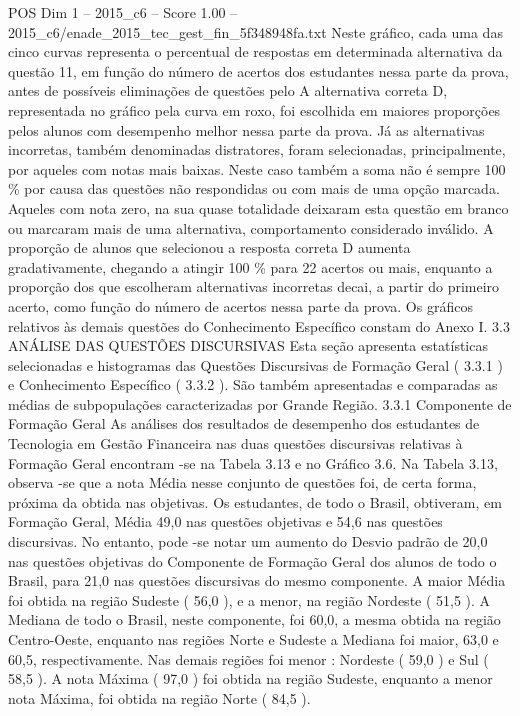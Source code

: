 \begin{textsample}{POS Dim 1 – 2015\_c6 – Score 1.00 – 2015\_c6/enade\_2015\_tec\_gest\_fin\_5f348948fa.txt}
Neste gráfico, cada uma das cinco curvas representa o percentual de respostas em determinada alternativa da questão 11, em função do número de acertos dos estudantes nessa parte da prova, antes de possíveis eliminações de questões pelo A alternativa correta D, representada no gráfico pela curva em roxo, foi escolhida em maiores proporções pelos alunos com desempenho melhor nessa parte da prova.
Já as alternativas incorretas, também denominadas distratores, foram selecionadas, principalmente, por aqueles com notas mais baixas.
Neste caso também a soma não é sempre 100 \% por causa das questões não respondidas ou com mais de uma opção marcada.
Aqueles com nota zero, na sua quase totalidade deixaram esta questão em branco ou marcaram mais de uma alternativa, comportamento considerado inválido.
A proporção de alunos que selecionou a resposta correta D aumenta gradativamente, chegando a atingir 100 \% para 22 acertos ou mais, enquanto a proporção dos que escolheram alternativas incorretas decai, a partir do primeiro acerto, como função do número de acertos nessa parte da prova.
Os gráficos relativos às demais questões do Conhecimento Específico constam do Anexo I. 3.3 ANÁLISE DAS QUESTÕES DISCURSIVAS Esta seção apresenta estatísticas selecionadas e histogramas das Questões Discursivas de Formação Geral ( 3.3.1 ) e Conhecimento Específico ( 3.3.2 ).
São também apresentadas e comparadas as médias de subpopulações caracterizadas por Grande Região. 3.3.1 Componente de Formação Geral As análises dos resultados de desempenho dos estudantes de Tecnologia em Gestão Financeira nas duas questões discursivas relativas à Formação Geral encontram -se na Tabela 3.13 e no Gráfico 3.6.
Na Tabela 3.13, observa -se que a nota Média nesse conjunto de questões foi, de certa forma, próxima da obtida nas objetivas.
Os estudantes, de todo o Brasil, obtiveram, em Formação Geral, Média 49,0 nas questões objetivas e 54,6 nas questões discursivas.
No entanto, pode -se notar um aumento do Desvio padrão de 20,0 nas questões objetivas do Componente de Formação Geral dos alunos de todo o Brasil, para 21,0 nas questões discursivas do mesmo componente.
A maior Média foi obtida na região Sudeste ( 56,0 ), e a menor, na região Nordeste ( 51,5 ).
A Mediana de todo o Brasil, neste componente, foi 60,0, a mesma obtida na região Centro-Oeste, enquanto nas regiões Norte e Sudeste a Mediana foi maior, 63,0 e 60,5, respectivamente.
Nas demais regiões foi menor : Nordeste ( 59,0 ) e Sul ( 58,5 ).
A nota Máxima ( 97,0 ) foi obtida na região Sudeste, enquanto a menor nota Máxima, foi obtida na região Norte ( 84,5 ).

\end{textsample}
